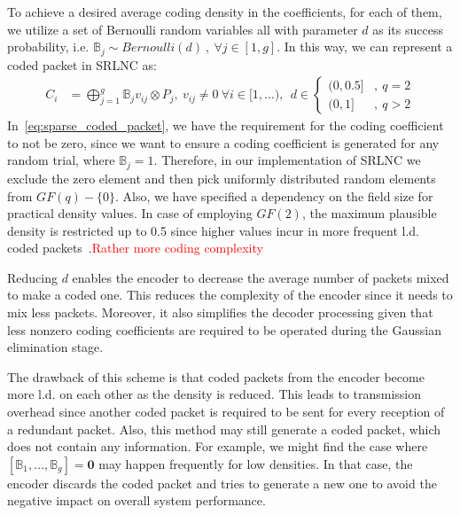 To achieve a desired average coding density in the coefficients, for each
of them, we utilize a set of Bernoulli random variables all with parameter
$d$ as its success probability, i.e. $\mathbb{B}_j \sim Bernoulli(d)\ ,\ \forall
j \in [1,g]$. In this way, we can represent a coded packet in \ac{SRLNC} as:
%
\begin{align} \label{eq:sparse_coded_packet}
    C_i  &= \bigoplus_{j=1}^{g} \mathbb{B}_j v_{ij} \otimes P_j ,\ v_{ij}
    \neq 0\
    \forall i \in [1,\ldots) ,\ \
    d \in
    \begin{cases}
        {(0,0.5]} & ,\ q = 2 \\
        {(0,1]}   & ,\ q > 2
    \end{cases}
\end{align}
%
In~\eqref{eq:sparse_coded_packet}, we have the requirement for the
coding coefficient to not be zero, since we want to ensure a coding
coefficient is generated for any random trial, where
$\mathbb{B}_j = 1$. Therefore, in our implementation of \ac{SRLNC} we
exclude the zero element and then pick uniformly distributed random
elements from $GF(q)-\{ 0 \}$. Also, we have specified a dependency on
the field size for practical density values. In case of employing
$GF(2)$, the maximum plausible density is restricted up to 0.5 since
higher values incur in more frequent \ac{l.d.} coded
packets~\cite{realworld_nc2013}.\textcolor{red}{Rather more coding complexity}

Reducing $d$ enables the encoder to decrease the average number of
packets mixed to make a coded one. This reduces the complexity
of the encoder since it needs to mix less packets. Moreover, it also
simplifies the decoder processing given that less nonzero coding
coefficients are required to be operated during the Gaussian
elimination stage.

The drawback of this scheme is that coded packets from the encoder
become more \ac{l.d.} on each other as the density is reduced.  This
leads to transmission overhead since another coded packet is required
to be sent for every reception of a redundant packet.  Also, this
method may still generate a coded packet, which does not contain any
information. For example, we might find the case where
$\left[\mathbb{B}_1, \ldots, \mathbb{B}_g \right] = \mathbf{0}$ may
happen frequently for low densities. In that case, the encoder
discards the coded packet and tries to generate a new one to avoid the
negative impact on overall system performance.

